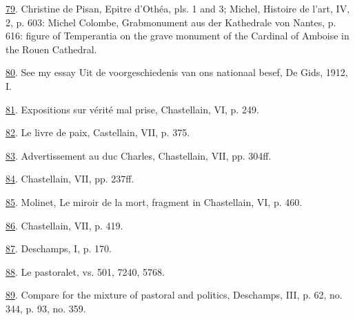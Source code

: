 \protect\hypertarget{23_NOTES.xhtmlux5cux23id_155}{\protect\hyperlink{21_Chapter_Thirteen__IMAGE_AND_WORD.xhtmlux5cux23id_154}{79}}.
Christine de Pisan, Epitre d'Othéa, pls. 1 and 3; Michel, Histoire de
l'art, IV, 2, p. 603: Michel Colombe, Grabmonument aus der Kathedrale
von Nantes, p. 616: figure of Temperantia on the grave monument of the
Cardinal of Amboise in the Rouen Cathedral.

\protect\hypertarget{23_NOTES.xhtmlux5cux23id_153}{\protect\hyperlink{21_Chapter_Thirteen__IMAGE_AND_WORD.xhtmlux5cux23id_152}{80}}.
See my essay Uit de voorgeschiedenis van ons nationaal besef, De Gids,
1912, I.

\protect\hypertarget{23_NOTES.xhtmlux5cux23id_151}{\protect\hyperlink{21_Chapter_Thirteen__IMAGE_AND_WORD.xhtmlux5cux23id_150}{81}}.
Expositions sur vérité mal prise, Chastellain, VI, p. 249.

\protect\hypertarget{23_NOTES.xhtmlux5cux23id_149}{\protect\hyperlink{21_Chapter_Thirteen__IMAGE_AND_WORD.xhtmlux5cux23id_148}{82}}.
Le livre de paix, Castellain, VII, p. 375.

\protect\hypertarget{23_NOTES.xhtmlux5cux23id_147}{\protect\hyperlink{21_Chapter_Thirteen__IMAGE_AND_WORD.xhtmlux5cux23id_146}{83}}.
Advertissement au duc Charles, Chastellain, VII, pp. 304ff.

\protect\hypertarget{23_NOTES.xhtmlux5cux23id_145}{\protect\hyperlink{21_Chapter_Thirteen__IMAGE_AND_WORD.xhtmlux5cux23id_144}{84}}.
Chastellain, VII, pp. 237ff.

\protect\hypertarget{23_NOTES.xhtmlux5cux23id_143}{\protect\hyperlink{21_Chapter_Thirteen__IMAGE_AND_WORD.xhtmlux5cux23id_142}{85}}.
Molinet, Le miroir de la mort, fragment in Chastellain, VI, p. 460.

\protect\hypertarget{23_NOTES.xhtmlux5cux23id_141}{\protect\hyperlink{21_Chapter_Thirteen__IMAGE_AND_WORD.xhtmlux5cux23id_140}{86}}.
Chastellain, VII, p. 419.

\protect\hypertarget{23_NOTES.xhtmlux5cux23id_139}{\protect\hyperlink{21_Chapter_Thirteen__IMAGE_AND_WORD.xhtmlux5cux23id_138}{87}}.
Deschamps, I, p. 170.

\protect\hypertarget{23_NOTES.xhtmlux5cux23id_137}{\protect\hyperlink{21_Chapter_Thirteen__IMAGE_AND_WORD.xhtmlux5cux23id_136}{88}}.
Le pastoralet, vs. 501, 7240, 5768.

\protect\hypertarget{23_NOTES.xhtmlux5cux23id_135}{\protect\hyperlink{21_Chapter_Thirteen__IMAGE_AND_WORD.xhtmlux5cux23id_134}{89}}.
Compare for the mixture of pastoral and politics, Deschamps, III, p. 62,
no. 344, p. 93, no. 359.

